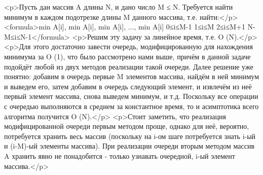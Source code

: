 <p>Пусть дан массив A длины N, и дано число M ≤ N. Требуется найти минимум в каждом подотрезке длины M данного массива, т.е. найти:</p>
<formula>min A[i],    min A[i],    min A[i],    ...,    min A[i]
0≤i≤M-1      1≤i≤M        2≤i≤M+1              N-M≤i≤N-1</formula>
<p>Решим эту задачу за линейное время, т.е. O (N).</p>
<p>Для этого достаточно завести очередь, модифицированную для нахождения минимума за O (1), что было рассмотрено нами выше, причём в данной задаче подойдёт любой из двух методов реализации такой очереди. Далее решение уже понятно: добавим в очередь первые M элементов массива, найдём в ней минимум и выведем его, затем добавим в очередь следующий элемент, и извлечём из неё первый элемент массива, снова выведем минимум, и т.д. Поскольку все операции с очередью выполняются в среднем за константное время, то и асимптотика всего алгоритма получится O (N).</p>
<p>Стоит заметить, что реализация модифицированной очереди первым методом проще, однако для неё, вероятно, потребуется хранить весь массив (поскольку на i-ом шаге потребуется знать i-ый и (i-M)-ый элементы массива). При реализации очереди вторым методом массив A хранить явно не понадобится - только узнавать очередной, i-ый элемент массива.</p>